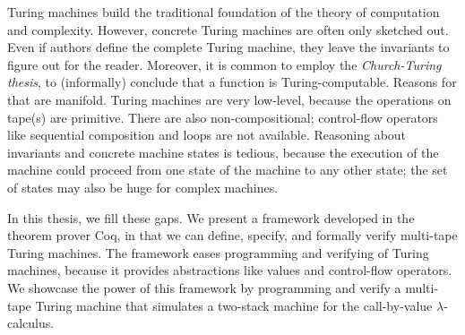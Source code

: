 Turing machines build the traditional foundation of the theory of computation and complexity.  However, concrete Turing machines are often only
sketched out.  Even if authors define the complete Turing machine, they leave the invariants to figure out for the reader.  Moreover, it is common to
employ the \textit{Church-Turing thesis}, to (informally) conclude that a function is Turing-computable.  Reasons for that are manifold.  Turing
machines are very low-level, because the operations on tape(s) are primitive.  There are also non-compositional; control-flow operators like
sequential composition and loops are not available.  Reasoning about invariants and concrete machine states is tedious, because the execution of the
machine could proceed from one state of the machine to any other state; the set of states may also be huge for complex machines.

In this thesis, we fill these gaps.  We present a framework developed in the theorem prover Coq, in that we can define, specify, and formally verify
multi-tape Turing machines.  The framework eases programming and verifying of Turing machines, because it provides abstractions like values and
control-flow operators.  We showcase the power of this framework by programming and verify a multi-tape Turing machine that simulates a two-stack
machine for the call-by-value $\lambda$-calculus.


